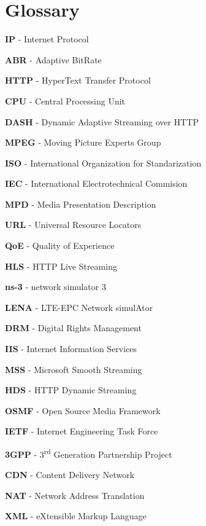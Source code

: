 \cleardoublepage
{}
\chapter*{Glossary}


\textbf{IP} - Internet Protocol

\textbf{ABR} - Adaptive BitRate

\textbf{HTTP} - HyperText Transfer Protocol

\textbf{CPU} - Central Processing Unit

\textbf{DASH} - Dynamic Adaptive Streaming over HTTP

\textbf{MPEG} - Moving Picture Experts Group

\textbf{ISO} - International Organization for Standarization

\textbf{IEC} - International Electrotechnical Commision

\textbf{MPD} - Media Presentation Description

\textbf{URL} - Universal Resource Locators

\textbf{QoE} - Quality of Experience

\textbf{HLS} - HTTP Live Streaming

\textbf{ns-3} - network simulator 3

\textbf{LENA} - LTE-EPC Network simulAtor

\textbf{DRM} - Digital Rights Management

\textbf{IIS} - Internet Information Services

\textbf{MSS} - Microsoft Smooth Streaming

\textbf{HDS} - HTTP Dynamic Streaming

\textbf{OSMF} - Open Source Media Framework

\textbf{IETF} - Internet Engineering Task Force

\textbf{3GPP} - 3\textsuperscript{rd} Generation Partnership Project

\textbf{CDN} - Content Delivery Network

\textbf{NAT} - Network Address Translation

\textbf{XML} - eXtensible Markup Language

\cleardoublepage
